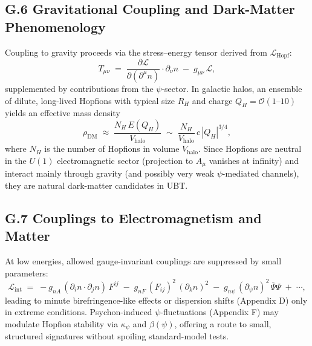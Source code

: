 \subsection*{G.6 Gravitational Coupling and Dark-Matter Phenomenology}
Coupling to gravity proceeds via the stress--energy tensor derived from $\mathcal{L}_{\mathrm{Hopf}}$:
\begin{equation}
T_{\mu\nu} \;=\; \frac{\partial \mathcal{L}}{\partial(\partial^\mu n)}\cdot \partial_\nu n \;-\; g_{\mu\nu}\,\mathcal{L},
\end{equation}
supplemented by contributions from the $\psi$-sector. 
In galactic halos, an ensemble of dilute, long-lived Hopfions with typical size $R_H$ and charge $Q_H=\mathcal{O}(1\text{--}10)$ yields an effective mass density
\begin{equation}
\rho_{\mathrm{DM}} \;\approx\; \frac{N_H\, E(Q_H)}{V_{\mathrm{halo}}} \;\sim\; \frac{N_H}{V_{\mathrm{halo}}}\, c\, |Q_H|^{3/4},
\end{equation}
where $N_H$ is the number of Hopfions in volume $V_{\mathrm{halo}}$. 
Since Hopfions are neutral in the $U(1)$ electromagnetic sector (projection to $A_\mu$ vanishes at infinity) and interact mainly through gravity (and possibly very weak $\psi$-mediated channels), they are natural dark-matter candidates in UBT.

\subsection*{G.7 Couplings to Electromagnetism and Matter}
At low energies, allowed gauge-invariant couplings are suppressed by small parameters:
\begin{equation}
\mathcal{L}_{\mathrm{int}} \;=\; - g_{nA}\, ( \partial_i n \cdot \partial_j n )\, F^{ij} \;-\; g_{nF}\, (F_{ij})^2\, ( \partial_k n )^2 \;-\; g_{n\psi}\, (\partial_\psi n)^2\, \bar{\Psi}\Psi \;+\; \cdots,
\end{equation}
leading to minute birefringence-like effects or dispersion shifts (Appendix D) only in extreme conditions. 
Psychon-induced $\psi$-fluctuations (Appendix F) may modulate Hopfion stability via $\kappa_\psi$ and $\beta(\psi)$, offering a route to small, structured signatures without spoiling standard-model tests.

